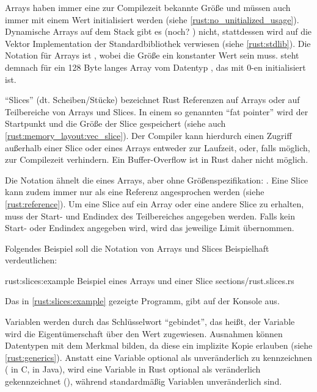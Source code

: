 Arrays haben immer eine zur Compilezeit bekannte Größe und müssen auch immer mit einem Wert initialisiert werden (siehe \autoref{rust:no_unitialized_usage}).
Dynamische Arrays auf dem Stack gibt es (noch? \cite{rust:github:alloca}) nicht,
stattdessen wird auf die Vektor Implementation der Standardbibliothek verwiesen (siehe \autoref{rust:stdlib}).
Die Notation für Arrays ist , wobei die Größe ein konstanter Wert sein muss.
\rustcinline{[0_u8; 128]} steht demnach für ein 128 Byte langes Array vom Datentyp , das mit 0-en initialisiert ist.

\enquote{Slices} (dt. Scheiben/Stücke) bezeichnet Rust Referenzen auf Arrays oder auf Teilbereiche von Arrays und Slices.
In einem so genannten \enquote{fat pointer} wird der Startpunkt und die Größe der Slice gespeichert  (siehe auch \autoref{rust:memory_layout:vec_slice}).
Der Compiler kann hierdurch einen Zugriff außerhalb einer Slice oder eines Arrays entweder zur Laufzeit, oder, falls möglich, zur Compilezeit verhindern.
Ein Buffer-Overflow ist in Rust daher nicht möglich.

Die Notation ähnelt die eines Arrays, aber ohne Größenspezifikation: \rustcinline{&[<Datentyp>]}.
Eine Slice kann zudem immer nur als eine Referenz angesprochen werden (siehe \autoref{rust:reference}).
Um eine Slice auf ein Array oder eine andere Slice zu erhalten, muss der Start- und  Endindex des Teilbereiches angegeben werden.
Falls kein Start- oder Endindex angegeben wird, wird das jeweilige Limit übernommen.


Folgendes Beispiel soll die Notation von Arrays und Slices Beispielhaft verdeutlichen:

\rustcinclude
	{rust:slices:example}
	{Beispiel eines Arrays und einer Slice}
	{sections/rust.slices.rs}
	
Das in \autoref{rust:slices:example} gezeigte Programm, gibt auf der Konsole  aus.

Variablen werden durch das  Schlüsselwort \enquote{gebindet}, das heißt, der Variable wird die Eigentümerschaft über den Wert zugewiesen.
Ausnahmen können Datentypen mit dem Merkmal  bilden, da diese ein implizite Kopie erlauben (siehe \autoref{rust:generics}).
Anstatt eine Variable optional als unveränderlich zu kennzeichnen ( in C,  in Java), wird eine Variable in Rust optional als veränderlich gekennzeichnet (), während standardmäßig Variablen unveränderlich sind.

